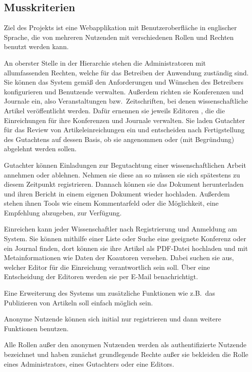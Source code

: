 
\subsection{Musskriterien}
Ziel des Projekts ist eine Webapplikation mit Benutzeroberfläche in englischer Sprache, die von mehreren Nutzenden mit verschiedenen Rollen und Rechten benutzt werden kann.

An oberster Stelle in der Hierarchie stehen die Administratoren \label{admin} mit allumfassenden Rechten, welche für das Betreiben der Anwendung zuständig sind.
Sie können das System gemäß den Anforderungen und Wünschen des Betreibers konfigurieren und Benutzende verwalten.
Außerdem richten sie Konferenzen und Journale ein, also Veranstaltungen bzw.\ Zeitschriften, bei denen wissenschaftliche Artikel veröffentlicht werden.
Dafür ernennen sie jeweils Editoren \label{editor}, die die Einreichungen für ihre Konferenzen und Journale verwalten.
Sie laden Gutachter für das Review von Artikeleinreichungen ein und entscheiden nach Fertigstellung des Gutachtens auf dessen Basis, ob sie angenommen oder (mit Begründung) abgelehnt werden sollen.

Gutachter \label{review} können Einladungen zur Begutachtung einer wissenschaftlichen Arbeit annehmen oder ablehnen.
Nehmen sie diese an so müssen sie sich spätestens zu diesem Zeitpunkt registrieren.
Dannach können sie das Dokument herunterladen und ihren Bericht in einem eigenen Dokument wieder hochladen.
Außerdem stehen ihnen Tools wie einem Kommentarfeld oder die Möglichkeit, eine Empfehlung abzugeben, zur Verfügung.

Einreichen kann jeder Wissenschaftler nach Registrierung und Anmeldung am System.
Sie können mithilfe einer Liste oder Suche eine geeignete Konferenz oder ein Journal finden,
dort können sie ihre Artikel als PDF-Datei hochladen und mit Metainformationen wie Daten der Koautoren versehen.
Dabei suchen sie aus, welcher Editor für die Einreichung verantwortlich sein soll.
Über eine Entscheidung der Editoren werden sie per E-Mail benachrichtigt.

Eine Erweiterung des Systems um zusätzliche Funktionen wie z.B.\ das Publizieren von Artikeln soll einfach möglich sein.

Anonyme Nutzende \label{anonym} können sich initial nur registrieren und dann weitere Funktionen benutzen.

Alle Rollen außer den anonymen Nutzenden werden als authentifizierte Nutzende \label{authentifiziert} bezeichnet und haben zunächst grundlegende Rechte außer sie bekleiden die Rolle eines Administrators, eines Gutachters oder eine Editors.

